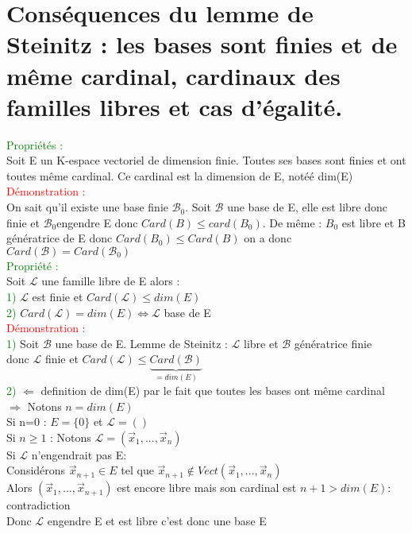 \documentclass{article}
\begin{document}
\section{Conséquences du lemme de Steinitz : les bases sont finies et de même cardinal, cardinaux des familles libres et cas d'égalité.}
\textcolor{green}{Propriétés :} \\
Soit E un K-espace vectoriel de dimension finie. Toutes ses bases sont finies et ont toutes même cardinal. Ce cardinal est la dimension de E, notéé dim(E) \\
\textcolor{red}{Démonstration :} \\
On sait qu'il existe une base finie $\mathcal B_0$. Soit $\mathcal B$ une base de E, elle est libre donc finie et $ \mathcal B_0$engendre E donc $Card(B) \leq card(B_0)$. De même : $B_0$ est libre et B génératrice de E donc $Card(B_0) \leq Card(B)$ on a donc $Card(\mathcal B)=Card(\mathcal B_0)$\\
\textcolor{green}{Propriété :} \\
Soit $ \mathcal L$ une famille libre de E alors : \\
\textcolor{green}{1)} $\mathcal L$ est finie et $Card(\mathcal L) \leq dim(E)$ \\
\textcolor{green}{2)} $Card(\mathcal L)=dim(E) \Longleftrightarrow \mathcal L$ base de E \\
\textcolor{red}{Démonstration :} \\
\textcolor{green}{1)} Soit $\mathcal B$ une base de E. Lemme de Steinitz : $\mathcal L$ libre et $\mathcal B$ génératrice finie \\
donc $\mathcal L$ finie et $Card(\mathcal L) \leq \underbrace{Card(\mathcal B)}_{=dim(E)}$ \\
\textcolor{green}{2)} $\Leftarrow$ definition de dim(E) par le fait que toutes les bases ont même cardinal \\
$\Rightarrow$ Notons $n=dim(E)$ \\
Si n=0 : $E=\lbrace 0 \rbrace$ et $\mathcal L=()$ \\
Si $n \geq 1$ : Notons $\mathcal L=(\vec x_1,..., \vec x_n)$ \\
Si $\mathcal L$ n'engendrait pas E: \\
Considérons $\vec x_{n+1} \in E$ tel que $\vec x_{n+1} \notin Vect(\vec x_1,...,\vec x_n)$ \\
Alors $(\vec x_1,...,\vec x_{n+1})$ est encore libre mais son cardinal est $n+1> dim(E)$: contradiction \\
Donc $\mathcal L$ engendre E et est libre c'est donc une base E
\end{document}
